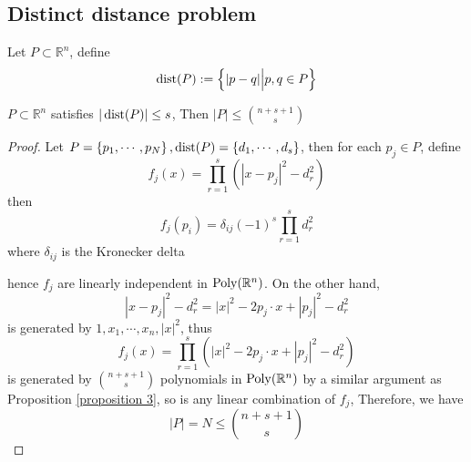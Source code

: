 \subsection{Distinct distance problem}

\begin{definition}\label{definition 17}
Let $ P \subset \mathbb{R}^{n} $, define
$$ \operatorname{dist}(P) := \left\{ |p-q| \Big| p,q \in P \right\} $$
\end{definition}

\begin{theorem}\label{theorem 18}
$ P \subset \mathbb{R}^{n} $ satisfies $ |\operatorname{dist}(P)| \leq s $, Then $ |P| \leq \binom{n+s+1}{s} $
\end{theorem}

\begin{proof}
Let $ P = \left\{ p_{1},\cdots,p_{N} \right\}, \operatorname{dist}(P) = \left\{ d_{1},\cdots,d_{s} \right\} $, then for each $ p_{j} \in P $, define
$$ f_{j}(x) = \prod_{r=1}^{s}\left( |x-p_{j}|^{2}-d_{r}^{2} \right) $$
then
$$ f_{j}(p_{i}) = \delta_{ij} (-1)^{s} \prod_{r=1}^{s} d_{r}^{2} $$
where $ \delta_{ij} $ is the Kronecker delta \par
hence $ f_{j} $ are linearly independent in $ \operatorname{Poly}(\mathbb{R}^{n}) $. On the other hand, 
$$ |x-p_{j}|^{2}-d_{r}^{2} = |x|^{2}-2p_{j} \cdot x+|p_{j}|^{2}-d_{r}^{2} $$
is generated by $ 1, x_{1}, \cdots, x_{n}, |x|^{2} $, thus
$$ f_{j}(x) = \prod_{r=1}^{s}\left( |x|^{2}-2p_{j} \cdot x+|p_{j}|^{2}-d_{r}^{2} \right) $$
is generated by $ \binom{n+s+1}{s} $ polynomials in $ \operatorname{Poly}(\mathbb{R}^{n}) $ by a similar argument as Proposition \ref{proposition 3}, so is any linear combination of $ f_{j} $, Therefore, we have 
$$ |P| = N \leq \binom{n+s+1}{s} $$
\end{proof}
